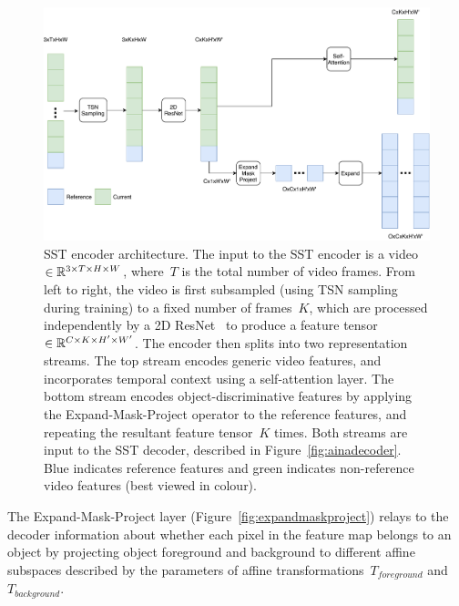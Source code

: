 \begin{figure}
\centering
\includegraphics[width=1.0\textwidth]{Figures/aina_encoder.pdf}
\caption{SST encoder architecture.
         The input to the SST encoder is a
         video~$\in\mathbb{R}{}^{3\times T \times H\times W}$, where~$T$ is the
         total number of video frames.
         From left to right, the video is first subsampled (using TSN
         sampling~\citep{wang2016temporal} during training) to a fixed number of
         frames~$K$, which are processed independently by a 2D
         ResNet~\citep{he2016deep} to produce a feature tensor~$\in
         \mathbb{R}{}^{C\times K \times H'\times W'}$.
         The encoder then splits into two representation streams.
         The top stream encodes generic video features, and incorporates
         temporal context using a self-attention layer.
         The bottom stream encodes object-discriminative features by applying
         the Expand-Mask-Project operator to the reference features, and
         repeating the resultant feature tensor~$K$ times.
         Both streams are input to the SST decoder, described in
         Figure~\ref{fig:ainadecoder}.
         Blue indicates reference features and green indicates non-reference
         video features (best viewed in colour).}
\label{fig:ainaencoder}
\end{figure}

The Expand-Mask-Project layer (Figure~\ref{fig:expandmaskproject}) relays to
the decoder information about whether each pixel in the feature map belongs to
an object by projecting object foreground and background to different affine
subspaces described by the parameters of affine
transformations~$T_{foreground}$ and~$T_{background}$.

